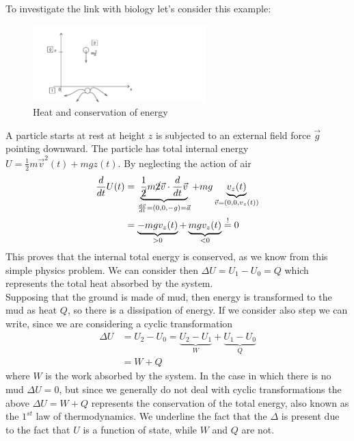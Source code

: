 \documentclass[../main/main.tex]{subfiles}
\begin{document}
To investigate the link with biology let's consider this example:
\begin{figure}[ht!]
    \centering
    \includegraphics[width=0.6\textwidth]{../frontespizio/tikz/0_lesson/00_1.pdf}
    \caption{Heat and conservation of energy}
\end{figure}
A particle starts at rest at height $z$ is subjected to an external field force $\vec{g}$ pointing downward. The particle has total internal energy $U = \frac{1}{2}m\vec{v}^2(t)+mgz(t)$. By neglecting the action of air
\begin{equation*}
    \begin{split}
        \frac{d}{dt}U(t) & =\underbrace{\frac{1}{\cancel{2}}m\cancel{2}\vec{v}\cdot\frac{d}{dt}\vec{v}}_{\frac{d\vec{v}}{dt}=(0,0,-g)=\vec{a}}+mg\underbrace{v_z(t)}_{\vec{v}=(0,0,v_z(t))}\\
        & = \underbrace{-mgv_z(t)}_{>0}+\underbrace{mgv_z(t)}_{<0}\stackrel{!}{=} 0
    \end{split}
\end{equation*}
This proves that the internal total energy is conserved, as we know from this simple physics problem.
We can consider then $\Delta U = U_1-U_0 = Q$ which represents the total heat absorbed by the system.\\
Supposing that the ground is made of mud, then energy is transformed to the mud as heat $Q$, so there is a dissipation of energy. If we consider also step  we can write, since we are considering a cyclic transformation
\begin{equation}
    \begin{split}
        \Delta U &= U_2-U_0 = \underbrace{U_2-U_1}_{W}+\underbrace{U_1-U_0}_{Q}\\
        &=W+Q
    \end{split}
\end{equation}
where $W$ is the work absorbed by the system. In the case in which there is no mud $\Delta U = 0$, but since we generally do not deal with cyclic transformations the above $\Delta U = W+Q$ represents the conservation of the total energy, also known as the $1^{st}$ law of thermodynamics. We underline the fact that the $\Delta$ is present due to the fact that $U$ is a function of state, while $W$ and $Q$ are not. 
\end{document}
